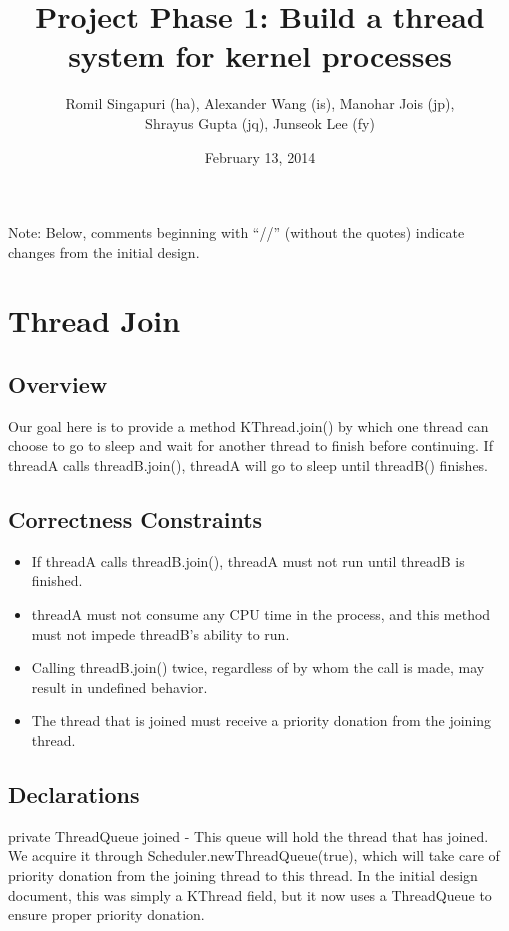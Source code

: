 \documentclass{article}
\title{Project Phase 1: Build a thread system for kernel processes}
\author{Romil Singapuri (ha), Alexander Wang (is), Manohar Jois (jp),\\Shrayus Gupta (jq), Junseok Lee (fy)}
\date{February 13, 2014}
\begin{document}
\maketitle

\noindent Note: Below, comments beginning with ``//'' (without the quotes) indicate changes from the initial design.

\section{Thread Join}

\subsection{Overview}

Our goal here is to provide a method KThread.join() by which one thread can choose to go to sleep and wait for another thread to finish before continuing. If threadA calls threadB.join(), threadA will go to sleep until threadB() finishes.

\subsection{Correctness Constraints}

\begin{itemize}
\item If threadA calls threadB.join(), threadA must not run until threadB is finished.
\item threadA must not consume any CPU time in the process, and this method must not impede threadB's ability to run.
\item Calling threadB.join() twice, regardless of by whom the call is made, may result in undefined behavior.
\item The thread that is joined must receive a priority donation from the joining thread.
\end{itemize}

\subsection{Declarations} %

{\ttfamily private ThreadQueue joined} - This queue will hold the thread that has joined. We acquire it through Scheduler.newThreadQueue(true), which will take care of priority donation from the joining thread to this thread. In the initial design document, this was simply a KThread field, but it now uses a ThreadQueue to ensure proper priority donation.
\end{document}
